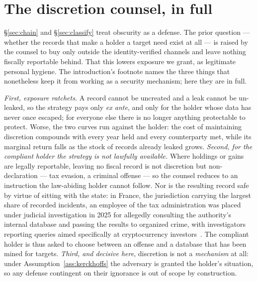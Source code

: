 \section{The discretion counsel, in full}
\label{app:intro}

\noindent \S\ref{sec:chain} and \S\ref{sec:classify} treat obscurity as a
defense. The prior question --- whether the records that make a holder a target
need exist at all --- is raised by the counsel to buy only outside the
identity-verified channels and leave nothing fiscally reportable behind. That
this lowers exposure we grant, as legitimate personal hygiene. The introduction's
footnote names the three things that nonetheless keep it from working as a
security mechanism; here they are in full.

\emph{First, exposure ratchets.} A record cannot be uncreated and a
leak cannot be un-leaked, so the strategy pays only \emph{ex ante}, and only for
the holder whose data has never once escaped; for everyone else there is no
longer anything protectable to protect. Worse, the two curves run against the
holder: the cost of maintaining discretion compounds with every year held and
every counterparty met, while its marginal return falls as the stock of records
already leaked grows. \emph{Second, for the compliant holder the strategy is not
lawfully available.} Where holdings or gains are legally reportable, leaving no
fiscal record is not discretion but non-declaration --- tax evasion, a criminal
offense --- so the counsel reduces to an instruction the law-abiding holder
cannot follow. Nor is the resulting record safe by virtue of sitting with the
state: in France, the jurisdiction carrying the largest share of recorded
incidents, an employee of the tax administration was placed under judicial
investigation in 2025 for allegedly consulting the authority's internal database
and passing the results to organized crime, with investigators reporting queries
aimed specifically at cryptocurrency investors~\cite{fisc-leak-2026}. The
compliant holder is thus asked to choose between an offense and a database that
has been mined for targets. \emph{Third, and decisive here}, discretion is not a
\emph{mechanism} at all: under Assumption~\ref{ass:kerckhoffs} the adversary is
granted the holder's situation, so any defense contingent on their ignorance is
out of scope by construction.

